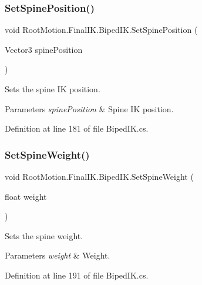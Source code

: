 \subsubsection{\texorpdfstring{Set\+Spine\+Position()}{SetSpinePosition()}}
{\footnotesize\ttfamily void Root\+Motion.\+Final\+I\+K.\+Biped\+I\+K.\+Set\+Spine\+Position (\begin{DoxyParamCaption}\item[{Vector3}]{spine\+Position }\end{DoxyParamCaption})}



Sets the spine IK position. 


\begin{DoxyParams}{Parameters}
{\em spine\+Position} & Spine IK position. \\
\hline
\end{DoxyParams}


Definition at line 181 of file Biped\+I\+K.\+cs.

\mbox{\label{class_root_motion_1_1_final_i_k_1_1_biped_i_k_a42e652485ff4fc1d1e0ec01814daca84}} 
\subsubsection{\texorpdfstring{Set\+Spine\+Weight()}{SetSpineWeight()}}
{\footnotesize\ttfamily void Root\+Motion.\+Final\+I\+K.\+Biped\+I\+K.\+Set\+Spine\+Weight (\begin{DoxyParamCaption}\item[{float}]{weight }\end{DoxyParamCaption})}



Sets the spine weight. 


\begin{DoxyParams}{Parameters}
{\em weight} & Weight. \\
\hline
\end{DoxyParams}


Definition at line 191 of file Biped\+I\+K.\+cs.

\mbox{\label{class_root_motion_1_1_final_i_k_1_1_biped_i_k_a8a574c591fde96dd451f99a6784bd5d5}} 
